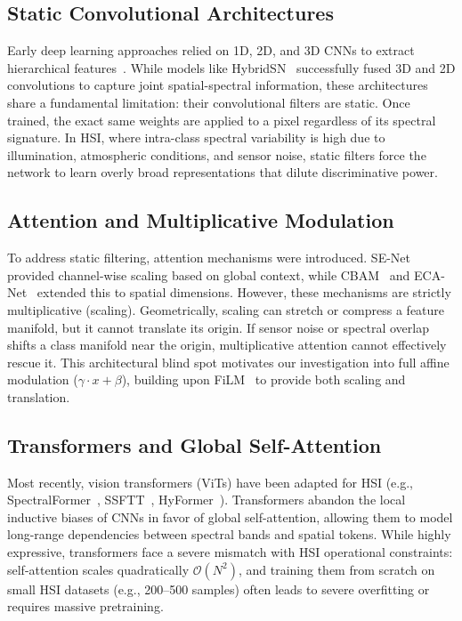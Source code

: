 \documentclass[conference]{IEEEtran}
\begin{document}
{\subsection{Static Convolutional Architectures}
Early deep learning approaches relied on 1D, 2D, and 3D CNNs to extract hierarchical features~\cite{hu2015deep,makantasis2015deep,li2017spectral}. While models like HybridSN~\cite{roy2020hybridsn} successfully fused 3D and 2D convolutions to capture joint spatial-spectral information, these architectures share a fundamental limitation: their convolutional filters are static. Once trained, the exact same weights are applied to a pixel regardless of its spectral signature. In HSI, where intra-class spectral variability is high due to illumination, atmospheric conditions, and sensor noise, static filters force the network to learn overly broad representations that dilute discriminative power.

\subsection{Attention and Multiplicative Modulation}
To address static filtering, attention mechanisms were introduced. SE-Net~\cite{hu2018squeeze} provided channel-wise scaling based on global context, while CBAM~\cite{woo2018cbam} and ECA-Net~\cite{wang2020eca} extended this to spatial dimensions. However, these mechanisms are strictly multiplicative (scaling). Geometrically, scaling can stretch or compress a feature manifold, but it cannot translate its origin. If sensor noise or spectral overlap shifts a class manifold near the origin, multiplicative attention cannot effectively rescue it. This architectural blind spot motivates our investigation into full affine modulation ($\gamma \cdot x + \beta$), building upon FiLM~\cite{perez2018film} to provide both scaling and translation.

\subsection{Transformers and Global Self-Attention}
Most recently, vision transformers (ViTs) have been adapted for HSI (e.g., SpectralFormer~\cite{hong2022spectralformer}, SSFTT~\cite{sun2022ssftt}, HyFormer~\cite{li2023hyformer}). Transformers abandon the local inductive biases of CNNs in favor of global self-attention, allowing them to model long-range dependencies between spectral bands and spatial tokens. While highly expressive, transformers face a severe mismatch with HSI operational constraints: self-attention scales quadratically $\mathcal{O}(N^2)$, and training them from scratch on small HSI datasets (e.g., 200--500 samples) often leads to severe overfitting or requires massive pretraining. 

}
\end{document}
